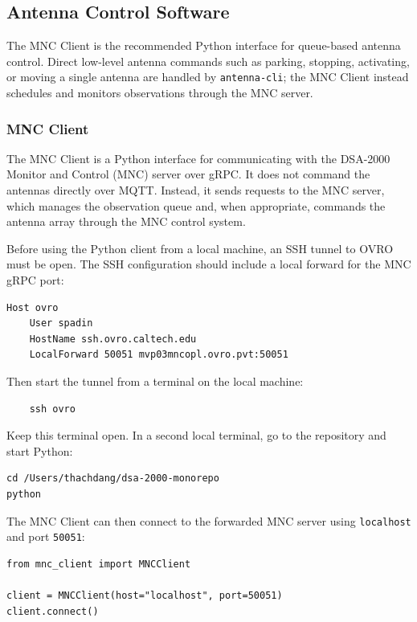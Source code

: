 \documentclass[12pt]{extarticle}
\begin{document}
\subsection{Antenna Control Software}
The MNC Client is the recommended Python interface for queue-based antenna control. Direct low-level antenna commands such as parking, stopping, activating, or moving a single antenna are handled by \texttt{antenna-cli}; the MNC Client instead schedules and monitors observations through the MNC server.

\subsubsection{MNC Client}
The MNC Client is a Python interface for communicating with the DSA-2000 Monitor and Control (MNC) server over gRPC. It does not command the antennas directly over MQTT. Instead, it sends requests to the MNC server, which manages the observation queue and, when appropriate, commands the antenna array through the MNC control system.

Before using the Python client from a local machine, an SSH tunnel to OVRO must be open. The SSH configuration should include a local forward for the MNC gRPC port:

\begin{lstlisting}
Host ovro
    User spadin
    HostName ssh.ovro.caltech.edu
    LocalForward 50051 mvp03mncopl.ovro.pvt:50051
\end{lstlisting}

Then start the tunnel from a terminal on the local machine:

\begin{lstlisting}
    ssh ovro
\end{lstlisting}

Keep this terminal open. In a second local terminal, go to the repository and start Python:

\begin{lstlisting}
cd /Users/thachdang/dsa-2000-monorepo
python
\end{lstlisting}

The MNC Client can then connect to the forwarded MNC server using \texttt{localhost} and port \texttt{50051}:

\begin{lstlisting}
from mnc_client import MNCClient

client = MNCClient(host="localhost", port=50051)
client.connect()
\end{lstlisting}
\end{document}
